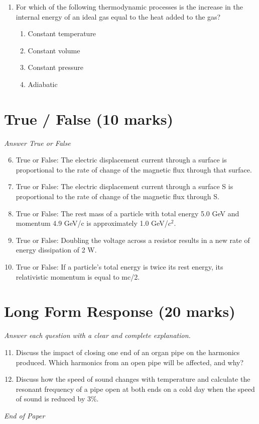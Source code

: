 \documentclass[12pt]{article}
\begin{document}
\begin{enumerate}[label=\arabic*.]
\begin{enumerate}[label=(\alph*)]
    \item P
    \item Sb
    \item B
\end{enumerate}
\item For which of the following thermodynamic processes is the increase in the internal energy of an ideal gas equal to the heat added to the gas?
\begin{enumerate}[label=(\alph*)]
    \item Constant temperature
    \item Constant volume
    \item Constant pressure
    \item Adiabatic
\end{enumerate}
\end{enumerate}

\section*{True / False (10 marks)}
\textit{Answer True or False}
\begin{enumerate}[label=\arabic*.]
\setcounter{enumi}{5}
\item True or False: The electric displacement current through a surface is proportional to the rate of change of the magnetic flux through that surface.
\item True or False: The electric displacement current through a surface S is proportional to the rate of change of the magnetic flux through S.
\item True or False: The rest mass of a particle with total energy 5.0 GeV and momentum 4.9 GeV/c is approximately 1.0 GeV/$c^2$.
\item True or False: Doubling the voltage across a resistor results in a new rate of energy dissipation of 2 W.
\item True or False: If a particle's total energy is twice its rest energy, its relativistic momentum is equal to mc/2.
\end{enumerate}

\section*{Long Form Response (20 marks)}
\textit{Answer each question with a clear and complete explanation.}
\begin{enumerate}[label=\arabic*.]
\setcounter{enumi}{10}
\item Discuss the impact of closing one end of an organ pipe on the harmonics produced. Which harmonics from an open pipe will be affected, and why?
\item Discuss how the speed of sound changes with temperature and calculate the resonant frequency of a pipe open at both ends on a cold day when the speed of sound is reduced by 3\%.
\end{enumerate}

\vfill
\noindent\textit{End of Paper}
\end{document}
